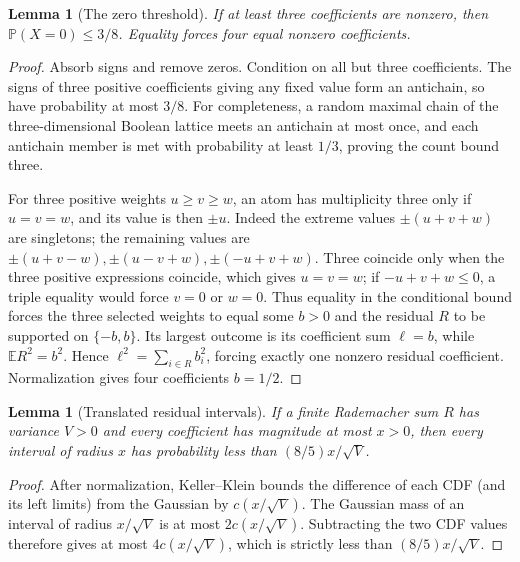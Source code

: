 \documentclass[11pt]{article}
\newtheorem{lemma}[theorem]{Lemma}
\theoremstyle{remark}\newtheorem{remark}[theorem]{Remark}
\newcommand{\Pp}{\mathbb P}
\newcommand{\E}{\mathbb E}
\begin{document}
\begin{lemma}[The zero threshold]\label{t:zero}
If at least three coefficients are nonzero, then
$\Pp(X=0)\le3/8$. Equality forces four equal nonzero coefficients.
\end{lemma}
\begin{proof}
Absorb signs and remove zeros. Condition on all but three coefficients.
The signs of three positive coefficients giving any fixed value form
an antichain, so have probability at most $3/8$. For completeness,
a random maximal chain of the three-dimensional Boolean lattice meets
an antichain at most once, and each antichain member is met with
probability at least $1/3$, proving the count bound three.

For three positive weights $u\ge v\ge w$, an atom has multiplicity
three only if $u=v=w$, and its value is then $\pm u$.
Indeed the extreme values $\pm(u+v+w)$ are singletons; the remaining
values are $\pm(u+v-w),\pm(u-v+w),\pm(-u+v+w)$.
Three coincide only when the three positive expressions coincide,
which gives $u=v=w$; if $-u+v+w\le0$, a triple equality would
force $v=0$ or $w=0$.
Thus equality in the conditional bound forces the three selected
weights to equal some $b>0$ and the residual $R$ to be supported on
$\{-b,b\}$. Its largest outcome is its coefficient sum $\ell=b$,
while $\E R^2=b^2$. Hence
$\ell^2=\sum_{i\in R}b_i^2$, forcing exactly one nonzero residual
coefficient. Normalization gives four coefficients $b=1/2$.
\end{proof}

\begin{lemma}[Translated residual intervals]\label{t:translated}
If a finite Rademacher sum $R$ has variance $V>0$ and every coefficient
has magnitude at most $x>0$, then every interval of radius $x$ has
probability less than $(8/5)x/\sqrt V$.
\end{lemma}
\begin{proof}
After normalization, Keller--Klein bounds the difference of each CDF
(and its left limits) from the Gaussian by $c(x/\sqrt V)$. The Gaussian
mass of an interval of radius $x/\sqrt V$ is at most $2c(x/\sqrt V)$.
Subtracting the two CDF values therefore gives at most $4c(x/\sqrt V)$,
which is strictly less than $(8/5)x/\sqrt V$.
\end{proof}
\end{document}
